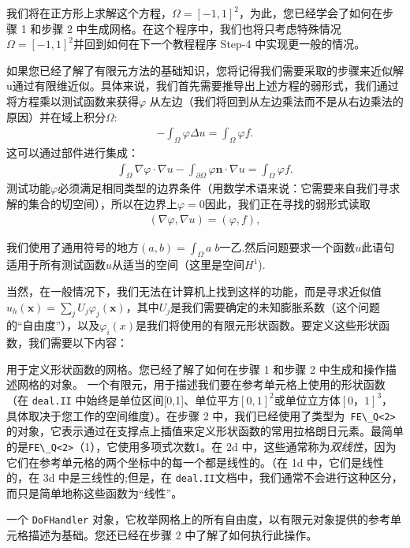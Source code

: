 \documentclass[12pt, a4paper]{article}
\numberwithin{equation}{section} %
\begin{document}
我们将在正方形上求解这个方程，$\Omega=[-1,1]^2$，为此，您已经学会了如何在步骤 1 和步骤 2 中生成网格。在这个程序中，我们也将只考虑特殊情况$\Omega=[-1,1]^2$并回到如何在下一个教程程序 Step-4 中实现更一般的情况。

如果您已经了解了有限元方法的基础知识，您将记得我们需要采取的步骤来近似解u通过有限维近似。具体来说，我们首先需要推导出上述方程的弱形式，我们通过将方程乘以测试函数来获得$\varphi$ 从左边（我们将回到从左边乘法而不是从右边乘法的原因）并在域上积分$\Omega$:
\begin{align*} -\int_\Omega \varphi \Delta u = \int_\Omega \varphi f. \end{align*}
这可以通过部件进行集成：
\begin{align*} \int_\Omega \nabla\varphi \cdot \nabla u - \int_{\partial\Omega} \varphi \mathbf{n}\cdot \nabla u = \int_\Omega \varphi f. \end{align*}
测试功能$\varphi$必须满足相同类型的边界条件（用数学术语来说：它需要来自我们寻求解的集合的切空间），所以在边界上$\varphi = 0$因此，我们正在寻找的弱形式读取
\begin{align*} (\nabla\varphi, \nabla u) = (\varphi, f), \end{align*}

我们使用了通用符号的地方$(a,b)=\int_\Omega a\; b$一乙.然后问题要求一个函数$u$此语句适用于所有测试函数$u$从适当的空间（这里是空间$H^1$).

当然，在一般情况下，我们无法在计算机上找到这样的功能，而是寻求近似值$u_h(\mathbf x)=\sum_j U_j \varphi_j(\mathbf x)$，其中$U_j$是我们需要确定的未知膨胀系数（这个问题的“自由度”），以及$\varphi_i(x)$是我们将使用的有限元形状函数。要定义这些形状函数，我们需要以下内容：

用于定义形状函数的网格。您已经了解了如何在步骤 1 和步骤 2 中生成和操作描述网格的对象。
一个有限元，用于描述我们要在参考单元格上使用的形状函数（在 \verb|deal.II| 中始终是单位区间[0,1]、单位平方$[0,1]^2$或单位立方体$[0，1]^3$，具体取决于您工作的空间维度）。在步骤 2 中，我们已经使用了类型为\verb| FE\_Q<2>| 的对象，它表示通过在支撑点上插值来定义形状函数的常用拉格朗日元素。最简单的是\verb|FE\_Q<2>|（1），它使用多项式次数1。在 2d 中，这些通常称为\textit{双线性}，因为它们在参考单元格的两个坐标中的每一个都是线性的。（在 1d 中，它们是线性的，在 3d 中是三线性的;但是，在 \verb|deal.II|文档中，我们通常不会进行这种区分，而只是简单地称这些函数为“线性”。

一个 \verb|DoFHandler| 对象，它枚举网格上的所有自由度，以有限元对象提供的参考单元格描述为基础。您还已经在步骤 2 中了解了如何执行此操作。
\end{document}
